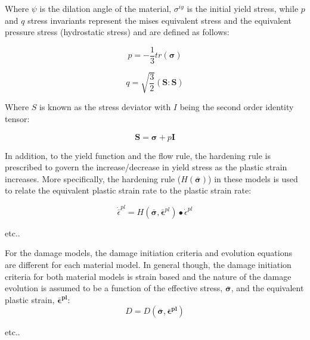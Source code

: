 Where $\psi$ is the dilation angle of the material, $\sigma^{iy}$ is the initial yield stress, while $p$ and $q$ stress invariants represent the mises
equivalent stress and the equivalent pressure stress (hydrostatic stress) and are defined as follows:

\begin{equation}
p=-\frac{1}{3}tr\left(\boldsymbol{\sigma}\right)\label{eqn:druc3}
\end{equation}

\begin{equation}
q=\sqrt{\frac{3}{2}}\left(\mathbf{S}:\mathbf{S}\right)\label{eqn:druc4}
\end{equation}

Where $S$ is known as the stress deviator with $I$ being the second order identity tensor:

\begin{equation}
\mathbf{S}=\boldsymbol{\sigma}+p\mathbf{I}\label{eqn:druc4-1}
\end{equation}

In addition, to the yield function and the flow rule, the hardening rule is prescribed to govern the increase/decrease in yield stress as the plastic strain increases. More specifically, the hardening rule ($H\left(\bar{\boldsymbol{\sigma}}\right)$) in these models is used to relate the equivalent plastic strain rate to the plastic strain rate: 

\begin{equation}
    \dot{\bar{\epsilon}}^{pl} 
    = 
    H
    \left(
        \bar{\boldsymbol{\sigma}}, \bar{\boldsymbol{\epsilon}}^{pl}
    \right)
    \bullet \dot{\epsilon}^{pl}
   
\label{eqn:const8d}
\end{equation}

etc..

For the damage models, the damage initiation criteria and evolution equations are different for each material model. In general though, the damage initiation criteria for both material models is strain based and the nature of the damage evolution is assumed to be a function of the effective stress, $\boldsymbol{\bar{\sigma}}$, and the equivalent plastic strain, $\boldsymbol{\bar{\epsilon}^{pl}}$:
\begin{equation}
D=D(\boldsymbol{\bar{\sigma}},\boldsymbol{\bar{\epsilon}^{pl}})\label{eqn:const8}
\end{equation}



etc..





